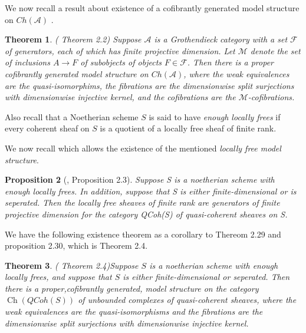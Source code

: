 \documentclass{article}
\DeclareMathOperator{\Ch}{Ch}
\newtheorem{theorem}{Theorem}[section]
\newtheorem{proposition}[theorem]{Proposition}
\theoremstyle{definition}
\theoremstyle{remark}
\begin{document}
We now recall a result about existence of a cofibrantly generated model structure on $Ch(\mathcal{A})$ .
\begin{theorem} (\cite{MR1814077} Theorem 2.2)
    Suppose $\mathcal{A}$ is a Grothendieck category with a set $\mathcal{F}$ of generators, each of which has finite projective dimension. Let $\mathcal{M}$ denote the set of inclusions $A \rightarrow F$ of subobjects of objects $F \in \mathcal{F}$. Then there is a proper cofibrantly generated model structure on $Ch(\mathcal{A})$, where the weak equivalences are the quasi-isomorphims, the fibrations are the dimensionwise split surjections with dimensionwise injective kernel, and the cofibrations are the $\mathcal{M}$-cofibrations.
\end{theorem}

Also recall that a Noetherian scheme $S$ is said to have \textit{enough locally frees} if every coherent sheaf on $S$ is a quotient of a locally free sheaf of finite rank. %

We now recall  \cite[proposition 2.3]{MR1814077} which allows the existence of the mentioned \textit{locally free model structure}.

\begin{proposition}[\cite{MR1814077}, Proposition 2.3] Suppose S is a noetherian scheme with enough locally frees. In addition, suppose that S is either finite-dimensional or is seperated. Then the locally free sheaves of finite rank are generators of finite projective dimension for the category QCoh(S) of quasi-coherent sheaves on S.
\end{proposition}

We have the following existence theorem as a corollary to Thereom 2.29 and proposition 2.30, which is \cite{MR1814077} Theorem 2.4.
\begin{theorem} (\cite{MR1814077} Theorem 2.4)\label{thm:locallyfreeModelStruct}
    Suppose $S$ is a noetherian scheme with enough locally frees, and suppose that $S$ is either finite-dimensional or seperated. Then there is a proper,cofibrantly generated, model structure on the category $\Ch(QCoh(S))$ of unbounded complexes of quasi-coherent sheaves, where the weak equivalences are the quasi-isomorphisms and the fibrations are the dimensionwise split surjections with dimensionwise injective kernel.
\end{theorem}
\end{document}
